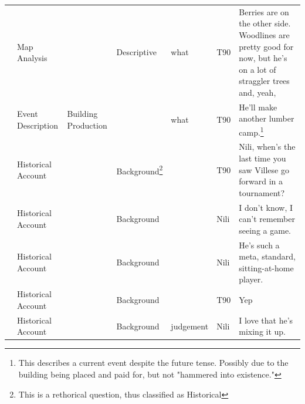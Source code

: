 {\begin{longtable}{@{}>{\theAppRow}r|L{2.3cm}L{2.2cm}L{1.4cm}L{2.2cm}L{0.5cm}U{5.6cm}@{}}
    & Map Analysis          &                      & Descriptive             & what              & T90     & Berries are on the other side. Woodlines are pretty good for now, but he's on a lot of straggler trees and, yeah,                                                                                                        \\
    & Event Description     & Building Production  &             & what              & T90     & He'll make another lumber camp.\footnote{This describes a current event despite the future tense. Possibly due to the building being placed and paid for, but not "hammered into existence."}                                                                                                                                                                                         \\
    & Historical Account    &                      & Background\footnote{This is a rethorical question, thus classified as Historical}  &                   & T90     & Nili, when's the last time you saw Villese go forward in a tournament?                                                                                                                                                   \\
    & Historical Account    &                      & Background  &                   & Nili    & I don't know, I can't remember seeing a game.                                                                                                                                                                            \\
    & Historical Account    &                      & Background  &                   & Nili    & He's such a meta, standard, sitting-at-home player.                                                                                                                                                                      \\
    & Historical Account    &                      & Background  &                   & T90     & Yep                                                                                                                                                                                                                      \\
    & Historical Account    &                      & Background  & judgement         & Nili    & I love that he's mixing it up.                                                                                                                                                                                           \\

\end{longtable}}
